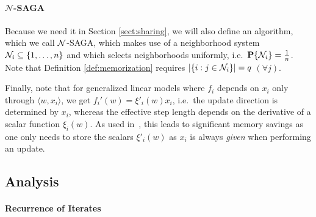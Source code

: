\paragraph{${\mathcal N}$-SAGA}
Because we need it in Section \ref{sect:sharing}, we will also define an algorithm, which we call ${\cal N}$-SAGA, which makes use of a neighborhood system ${\cal N}_i \subseteq \{1,\dots,n\}$ and which selects neighborhoods uniformly, i.e.~${{\bf P}}\{{\cal N}_i\}= \frac 1n$.  Note that Definition \ref{def:memorization} requires $| \{i: j \in {\cal N}_i\}|=q$ $(\forall j)$. 

Finally, note that for generalized linear models where $f_i$ depends on $x_i$ only through $\langle w, x_i \rangle$, we get $f_i'(w) = \xi'_i(w) x_i$, i.e.~the update direction is determined by $x_i$, whereas the effective step length depends on the derivative of a scalar function $\xi_i(w)$. As used in~\cite{schmidt2013minimizing}, this leads to significant memory savings as one only needs to store the scalars $\xi'_i(w)$ as $x_i$ is always \textit{given} when performing an update. 

%
\subsection{Analysis}
%
\paragraph*{Recurrence of Iterates}


